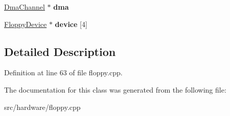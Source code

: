 \begin{DoxyCompactItemize}
\item 
\hypertarget{classFloppyController_a03a815344538d3ffe9b796369e87b86e}{\hyperlink{classDmaChannel}{Dma\-Channel} $\ast$ {\bfseries dma}}\label{classFloppyController_a03a815344538d3ffe9b796369e87b86e}

\item 
\hypertarget{classFloppyController_a37fba88fd67d407f6f42c8af12818d2a}{\hyperlink{classFloppyDevice}{Floppy\-Device} $\ast$ {\bfseries device} \mbox{[}4\mbox{]}}\label{classFloppyController_a37fba88fd67d407f6f42c8af12818d2a}

\end{DoxyCompactItemize}


\subsection{Detailed Description}


Definition at line 63 of file floppy.\-cpp.



The documentation for this class was generated from the following file\-:\begin{DoxyCompactItemize}
\item 
src/hardware/floppy.\-cpp\end{DoxyCompactItemize}
